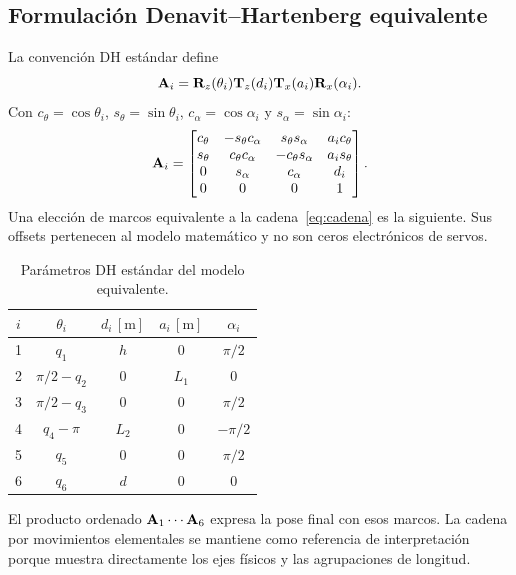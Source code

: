 \subsection{Formulación Denavit--Hartenberg equivalente}
La convención DH estándar define
\begin{equation}
\mathbf{A}_i=\mathbf{R}_z(\theta_i)\mathbf{T}_z(d_i)\mathbf{T}_x(a_i)\mathbf{R}_x(\alpha_i).
\end{equation}
Con $c_\theta=\cos\theta_i$, $s_\theta=\sin\theta_i$, $c_\alpha=\cos\alpha_i$ y $s_\alpha=\sin\alpha_i$:
\begin{equation}
\mathbf{A}_i=\begin{bmatrix}
c_\theta&-s_\theta c_\alpha&s_\theta s_\alpha&a_ic_\theta\\
s_\theta&c_\theta c_\alpha&-c_\theta s_\alpha&a_is_\theta\\
0&s_\alpha&c_\alpha&d_i\\0&0&0&1
\end{bmatrix}.
\end{equation}
Una elección de marcos equivalente a la cadena~\eqref{eq:cadena} es la siguiente. Sus offsets pertenecen al modelo matemático y no son ceros electrónicos de servos.
\begin{table}[!htbp]\centering
\caption{Parámetros DH estándar del modelo equivalente.}
\begin{tabular}{ccccc}\toprule
$i$&$\theta_i$&$d_i\,[\mathrm m]$&$a_i\,[\mathrm m]$&$\alpha_i$\\\midrule
1&$q_1$&$h$&0&$\pi/2$\\
2&$\pi/2-q_2$&0&$L_1$&0\\
3&$\pi/2-q_3$&0&0&$\pi/2$\\
4&$q_4-\pi$&$L_2$&0&$-\pi/2$\\
5&$q_5$&0&0&$\pi/2$\\
6&$q_6$&$d$&0&0\\\bottomrule
\end{tabular}
\end{table}
El producto ordenado $\mathbf{A}_1\cdots\mathbf{A}_6$ expresa la pose final con esos marcos. La cadena por movimientos elementales se mantiene como referencia de interpretación porque muestra directamente los ejes físicos y las agrupaciones de longitud.

